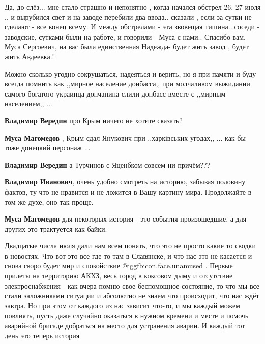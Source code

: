 \begin{itemize}
\begin{itemize}
Да, до слёз...
мне стало страшно и непонятно , когда начался обстрел 26, 27 июля ,, и вырубился свет и на заводе перебили два ввода.. сказали , если за сутки не сделают - все конец всему. И между обстрелами - эта звовещая тишина...соседи - заводские, сутками были на работе, и говорили - Муса с нами..
Спасибо вам, Муса Сергоевич, на вас была единственная Надежда- будет жить завод , будет жить Авдеевка.!
\end{itemize} %


Можно сколько угодно сокрушаться, надеяться и верить, но я при памяти и буду
всегда помнить как ,,мирное население донбасса,, при молчаливом выжидании
самого богатого украинца-дончанина слили донбасс вместе с ,,мирным населением,,
...

\begin{itemize} %
\textbf{Владимир Вередин} про Крым ничего не хотите сказать?

\textbf{Муса Магомедов} , Крым сдал Янукович при ,,харківських угодах,, ... как бы тоже донецкий персонаж ...

\textbf{Владимир Вередин} а Турчинов с Яценбком совсем ни причём???


\textbf{Владимир Иванович}, очень удобно смотреть на историю, забывая половину фактов, ту что не нравится и не ложится в Вашу картину мира. Продолжайте в том же духе, оно так проще.

\textbf{Муса Магомедов} для некоторых история - это события произошедшие, а для других это трактуется как байки.
\end{itemize} %


Двадцатые числа июля дали нам всем понять, что это не просто какие то сводки в
новостях. Что вот это все где то там в Славянске, и что нас это не касается и
снова скоро будет мир и спокойствие  @igg{fbicon.face.unamused} . Первые прилеты на территорию АКХЗ, весь
город в коксовом дыму и отсутствие электроснабжения - как вчера помню свое
беспомощное состояние, то что мы все стали заложниками ситуации и абсолютно не
знаем что происходит, что нас ждёт завтра. Но при этом от каждого из нас
зависит что-то, и мы каждый можем повлиять, пусть даже случайно оказаться в
нужном времени и месте и помочь аварийной бригаде добраться на место для
устранения аварии. И каждый тот день это теперь история 


\end{itemize}
